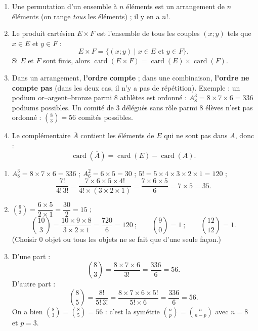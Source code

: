 \documentclass[11pt]{article}
\newcommand{\cle}[1]{{\popxbold\color{popdark}#1}}
\begin{document}
\begin{corrige}
\begin{enumerate}
\item Une permutation d'un ensemble à $n$ éléments est un arrangement de \textbf{$n$} éléments (on range \emph{tous} les éléments) ; il y en a \textbf{$n!$}.
\item Le \cle{produit cartésien} $E\times F$ est l'ensemble de tous les couples $(x;y)$ tels que $x\in E$ et $y\in F$ :
\[ E\times F=\{(x;y)\mid x\in E \text{ et } y\in F\}. \]
Si $E$ et $F$ sont finis, alors $\operatorname{card}(E\times F)=\operatorname{card}(E)\times\operatorname{card}(F)$.
\item Dans un \cle{arrangement}, \textbf{l'ordre compte} ; dans une \cle{combinaison}, \textbf{l'ordre ne compte pas} (dans les deux cas, il n'y a pas de répétition). Exemple : un podium or--argent--bronze parmi $8$ athlètes est ordonné : $A_8^3=8\times7\times6=336$ podiums possibles. Un comité de $3$ délégués sans rôle parmi $8$ élèves n'est pas ordonné : $\binom{8}{3}=56$ comités possibles.
\item Le complémentaire $\overline{A}$ contient les éléments de $E$ qui ne sont pas dans $A$, donc :
\[ \operatorname{card}(\overline{A})=\operatorname{card}(E)-\operatorname{card}(A). \]
\end{enumerate}
\end{corrige}

\begin{corrige}
\begin{enumerate}
\item $A_8^3=8\times7\times6=336$ ; \quad $A_6^2=6\times5=30$ ; \quad $5!=5\times4\times3\times2\times1=120$ ;
\[ \frac{7!}{4!\,3!}=\frac{7\times6\times5\times4!}{4!\times(3\times2\times1)}=\frac{7\times6\times5}{6}=7\times5=35. \]
\item $\binom{6}{2}=\dfrac{6\times5}{2\times1}=\dfrac{30}{2}=15$ ;
\[ \binom{10}{3}=\frac{10\times9\times8}{3\times2\times1}=\frac{720}{6}=120 \ ; \qquad \binom{9}{0}=1 \ ; \qquad \binom{12}{12}=1. \]
(Choisir $0$ objet ou tous les objets ne se fait que d'une seule façon.)
\item D'une part :
\[ \binom{8}{3}=\frac{8\times7\times6}{3!}=\frac{336}{6}=56. \]
D'autre part :
\[ \binom{8}{5}=\frac{8!}{5!\,3!}=\frac{8\times7\times6\times5!}{5!\times6}=\frac{336}{6}=56. \]
On a bien $\binom{8}{3}=\binom{8}{5}=56$ : c'est la \cle{symétrie} $\binom{n}{p}=\binom{n}{n-p}$ avec $n=8$ et $p=3$.
\end{enumerate}
\end{corrige}
\end{document}
